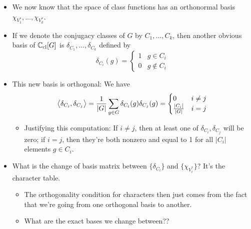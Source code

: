 \documentclass[../notes.tex]{subfiles}
\begin{document}
\begin{itemize}
\begin{itemize}
        \item We now know that the space of class functions has an orthonormal basis $\chi_{V_1^*},\dots,\chi_{V_k^*}$.
        \item If we denote the conjugacy classes of $G$ by $C_1,\dots,C_k$, then another obvious basis of $\mathbb{C}_\text{cl}[G]$ is $\delta_{C_1},\dots,\delta_{C_k}$ defined by
        \begin{equation*}
            \delta_{C_i}(g) =
            \begin{cases}
                1 & g\in C_i\\
                0 & g\notin C_i
            \end{cases}
        \end{equation*}
        \item This new basis is orthogonal: We have
        \begin{equation*}
            \left\langle{\delta_{C_i},\delta_{C_j}}\right\rangle = \frac{1}{|G|}\sum_{g\in G}\delta_{C_i}(g)\delta_{C_j}(g) =
            \begin{cases}
                0 & i\neq j\\
                \frac{|C_i|}{|G|} & i=j
            \end{cases}
        \end{equation*}
        \begin{itemize}
            \item Justifying this computation: If $i\neq j$, then at least one of $\delta_{C_i},\delta_{C_j}$ will be zero; if $i=j$, then they're both nonzero and equal to 1 for all $|C_i|$ elements $g\in C_i$.
        \end{itemize}
        \item What is the change of basis matrix between $\{\delta_{C_i}\}$ and $\{\chi_{V_i^*}\}$? It's the character table.
        \begin{itemize}
            \item The orthogonality condition for characters then just comes from the fact that we're going from one orthogonal basis to another.
            \item What are the exact bases we change between??
        \end{itemize}
    \end{itemize}
\end{itemize}
\end{document}
